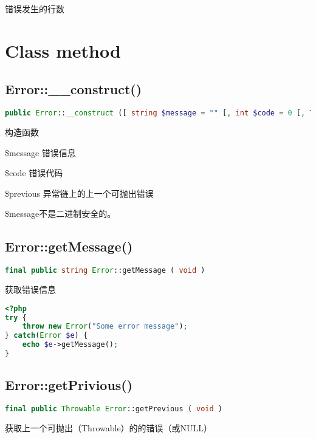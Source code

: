 错误发生的行数


\section{Class method}


\subsection{Error::\_\_construct()}


\begin{lstlisting}[language=PHP]
public Error::__construct ([ string $message = "" [, int $code = 0 [, Throwable $previous = NULL ]]] )
\end{lstlisting}

构造函数


\begin{compactitem}
\item \$message 错误信息
\item \$code 错误代码
\item \$previous 异常链上的上一个可抛出错误
\end{compactitem}

\$message不是二进制安全的。

\subsection{Error::getMessage()}

\begin{lstlisting}[language=PHP]
final public string Error::getMessage ( void )
\end{lstlisting}

获取错误信息




\begin{lstlisting}[language=PHP]
<?php
try {
    throw new Error("Some error message");
} catch(Error $e) {
    echo $e->getMessage();
}
\end{lstlisting}


\subsection{Error::getPrivious()}

\begin{lstlisting}[language=PHP]
final public Throwable Error::getPrevious ( void )
\end{lstlisting}

获取上一个可抛出（Throwable）的的错误（或NULL）





